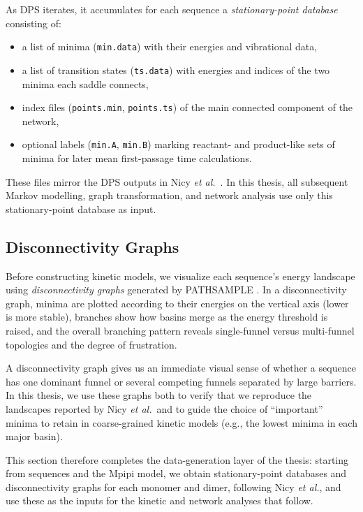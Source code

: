 As DPS iterates, it accumulates for each sequence a \emph{stationary-point database}
consisting of:

\begin{itemize}
  \item a list of minima (\texttt{min.data}) with their energies and vibrational data,
  \item a list of transition states (\texttt{ts.data}) with energies and indices of the
        two minima each saddle connects,
  \item index files (\texttt{points.min}, \texttt{points.ts}) of the main connected
        component of the network,
  \item optional labels (\texttt{min.A}, \texttt{min.B}) marking reactant- and
        product-like sets of minima for later mean first-passage time calculations.
\end{itemize}

These files mirror the DPS outputs in Nicy \emph{et al.}\ \cite{Nicy2024Mpipi}. In
this thesis, all subsequent Markov modelling, graph transformation, and network
analysis use only this stationary-point database as input.

\subsection{Disconnectivity Graphs}\label{subsec:disconnectivity}

Before constructing kinetic models, we visualize each sequence's energy landscape
using \emph{disconnectivity graphs} generated by PATHSAMPLE
\cite{Wales1998Archetypal}. In a disconnectivity graph, minima are plotted according
to their energies on the vertical axis (lower is more stable), branches show how
basins merge as the energy threshold is raised, and the overall branching pattern
reveals single-funnel versus multi-funnel topologies and the degree of frustration.

A disconnectivity graph gives us an immediate visual sense of whether a sequence has
one dominant funnel or several competing funnels separated by large barriers. In this
thesis, we use these graphs both to verify that we reproduce the landscapes reported by
Nicy \emph{et al.}\ and to guide the choice of ``important'' minima to retain in
coarse-grained kinetic models (e.g., the lowest minima in each major basin).

This section therefore completes the data-generation layer of the thesis: starting from
sequences and the Mpipi model, we obtain stationary-point databases and disconnectivity
graphs for each monomer and dimer, following Nicy \emph{et al.}, and use these as the
inputs for the kinetic and network analyses that follow.

